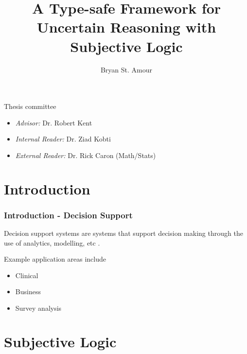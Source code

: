 \documentclass{beamer}
\title{A Type-safe Framework for Uncertain Reasoning with Subjective Logic}
\author{Bryan St. Amour}
\begin{document}
\begin{frame}
\titlepage
\end{frame}

\begin{frame}

Thesis committee

\begin{itemize}
  \item \emph{Advisor:} Dr. Robert Kent
  \item \emph{Internal Reader:} Dr. Ziad Kobti
  \item \emph{External Reader:} Dr. Rick Caron (Math/Stats)
\end{itemize}

\end{frame}

\begin{frame}
\tableofcontents
\end{frame}


\section{Introduction}

\begin{frame}
\frametitle{Introduction - Decision Support}

Decision support systems are systems that support decision making
through the use of analytics, modelling, etc \cite{sprague_framework_1980}.

Example application areas include

\begin{itemize}
  \item Clinical \cite{berner2007clinical}
  \item Business \cite{klein_knowledge-based}
  \item Survey analysis \cite{kent2010application}
\end{itemize}

\end{frame}


\section{Subjective Logic}
\end{document}
